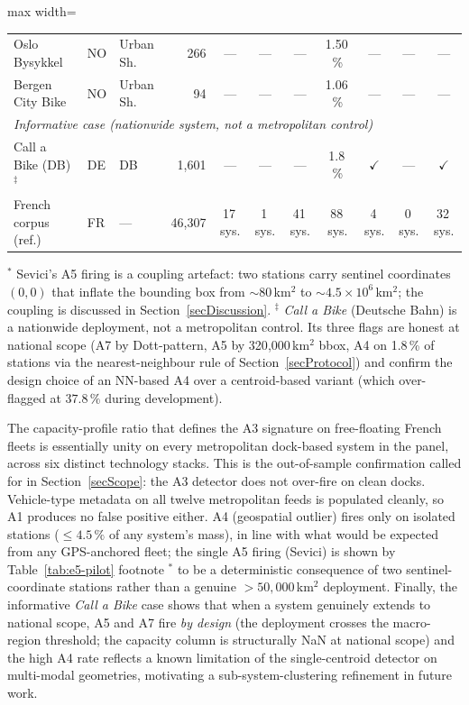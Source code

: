 \documentclass[11pt,a4paper]{article}
\begin{document}
\begin{table}[!htbp]
\begin{adjustbox}{max width=\textwidth}
\begin{tabular}{@{}lllr@{\hskip 6pt}ccccccc@{}}
Oslo Bysykkel          & NO & Urban Sh. & 266  & --- & --- & --- & 1.50\,\% & --- & --- & --- \\
Bergen City Bike       & NO & Urban Sh. & 94   & --- & --- & --- & 1.06\,\% & --- & --- & --- \\
\midrule
\multicolumn{11}{l}{\emph{Informative case (nationwide system, not a metropolitan control)}}\\
Call a Bike (DB)$^\ddag$ & DE & DB & 1{,}601 & --- & --- & --- & 1.8\,\% & $\checkmark$ & --- & $\checkmark$ \\
\midrule
French corpus (ref.)   & FR & --- & 46{,}307 & 17\,sys. & 1\,sys. & 41\,sys. & 88\,sys. & 4\,sys. & 0\,sys. & 32\,sys. \\
\bottomrule
\end{tabular}
\end{adjustbox}

\medskip
{\footnotesize $^\ast$ Sevici's A5 firing is a coupling artefact:
two stations carry sentinel coordinates $(0, 0)$ that inflate the
bounding box from $\sim 80$\,km$^2$ to $\sim 4.5\times 10^6$\,km$^2$;
the coupling is discussed in Section~\ref{secDiscussion}.
$^\ddag$ \emph{Call a Bike} (Deutsche Bahn) is a nationwide
deployment, not a metropolitan control. Its three flags are
honest at national scope (A7 by Dott-pattern, A5 by 320{,}000\,km$^2$
bbox, A4 on 1.8\,\% of stations via the nearest-neighbour rule of
Section~\ref{secProtocol}) and confirm the design choice of an
NN-based A4 over a centroid-based variant (which over-flagged at
$37.8\,\%$ during development).}
\end{table}

The capacity-profile ratio that
defines the A3 signature on free-floating French fleets is
essentially unity on every metropolitan dock-based system
in the panel, across six distinct technology stacks. This is the
out-of-sample confirmation called for in
Section~\ref{secScope}: the A3 detector does not over-fire on
clean docks. Vehicle-type metadata on all twelve
metropolitan feeds is populated cleanly, so A1 produces no false
positive either. A4 (geospatial outlier) fires only on
isolated stations ($\leq 4.5\,\%$ of any system's mass), in line
with what would be expected from any GPS-anchored fleet; the
single A5 firing (Sevici) is shown by Table~\ref{tab:e5-pilot}
footnote $^\ast$ to be a deterministic consequence of two
sentinel-coordinate stations rather than a genuine
$> 50{,}000$\,km$^2$ deployment. Finally, the informative
\emph{Call a Bike} case shows that when a system genuinely
extends to national scope, A5 and A7 fire \emph{by design} (the
deployment crosses the macro-region threshold; the capacity
column is structurally NaN at national scope) and the high A4
rate reflects a known limitation of the single-centroid detector
on multi-modal geometries, motivating a sub-system-clustering
refinement in future work.
\end{document}
